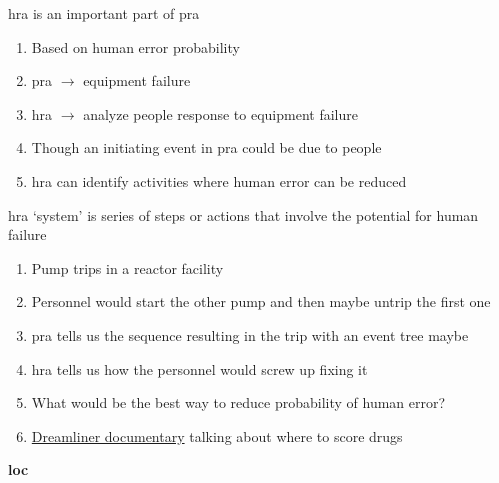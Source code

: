 \documentclass[aspectratio=1610,pdftex,dvipsnames,compress,xcolor={dvipsnames}]{beamer}
\newcommand{\acs}{\acrshort} %
\begin{document}
\addtocounter{framenumber}{-1}
\begin{frame}{\acs{hra} is an important part of \acs{pra}}
    \begin{enumerate}[series=outerlist,topsep=0pt,itemsep=21pt,leftmargin=*,label=(\arabic*)]
        \item[]Based on human error probability
        \item[]\acs{pra} $\rightarrow$ equipment failure
        \item[]\acs{hra} $\rightarrow$ analyze people response to equipment failure
        \item[]Though an initiating event in \acs{pra} could be due to people
        \item[]\acs{hra} can identify activities where human error can be reduced
    \end{enumerate}
\end{frame}


\begin{frame}{\acs{hra} `system' is series of steps or actions that involve the potential for human failure}
    \begin{enumerate}[series=outerlist,topsep=0pt,itemsep=18pt,leftmargin=*,label=(\arabic*)]
        \item[]Pump trips in a reactor facility
        \item[]Personnel would start the other pump and then maybe untrip the first one
        \item[]\acs{pra} tells us the sequence resulting in the trip with an event tree maybe
        \item[]\acs{hra} tells us how the personnel would screw up fixing it
        \item[]What would be the best way to reduce probability of human error?
        \item[]\href{https://uidaho.pressbooks.pub/riskassessment/chapter/contemporary-cases-in-risk-assessment-2/}{Dreamliner documentary} talking about where to score drugs
    \end{enumerate}
\end{frame}


\begin{frame}[plain]{}
    \centering\LARGE\textbf{\acs{loc}}
\end{frame}
\end{document}
